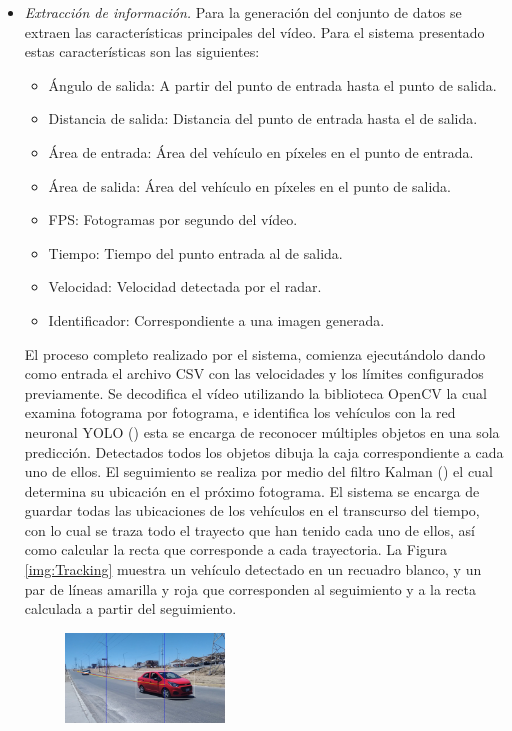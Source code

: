 \documentclass{llncs}
\begin{document}
\begin{itemize}
    \item \textit{Extracción de información.} Para la generación del conjunto de datos se extraen las características principales del vídeo. Para el sistema presentado estas características son las siguientes:
\begin{itemize}
    \item Ángulo de salida: A partir del punto de entrada hasta el punto de salida.
    \item Distancia de salida: Distancia del punto de entrada hasta el de salida.
    \item Área de entrada: Área del vehículo en píxeles en el punto de entrada.
    \item Área de salida: Área del vehículo en píxeles en el punto de salida.
    \item FPS: Fotogramas por segundo del vídeo.
    \item Tiempo: Tiempo del punto entrada al de salida.
    \item Velocidad: Velocidad detectada por el radar.
    \item Identificador: Correspondiente a una imagen generada.
\end{itemize}
El proceso completo realizado por el sistema, comienza ejecutándolo dando como entrada el archivo CSV con las velocidades y los límites configurados previamente. Se decodifica el vídeo utilizando la biblioteca OpenCV la cual examina fotograma por fotograma, e identifica los vehículos con la red neuronal YOLO (\cite{YOLO}) esta se encarga de reconocer múltiples objetos en una sola predicción. Detectados todos los objetos dibuja la caja correspondiente a cada uno de ellos. El seguimiento se realiza por medio del filtro Kalman (\cite{welch1995introduction}) el cual determina su ubicación en el próximo fotograma. El sistema se encarga de guardar todas las ubicaciones de los vehículos en el transcurso del tiempo, con lo cual se traza todo el trayecto que han tenido cada uno de ellos, así como calcular la recta que corresponde a cada trayectoria. La Figura \ref{img:Tracking} muestra un vehículo detectado en un recuadro blanco, y un par de líneas amarilla y roja que corresponden al seguimiento y a la recta calculada a partir del seguimiento.
\begin{figure}[H]
    \includegraphics[width=0.4\textwidth]{imgs/track.jpg}

\end{figure}
\end{itemize}
\end{document}

